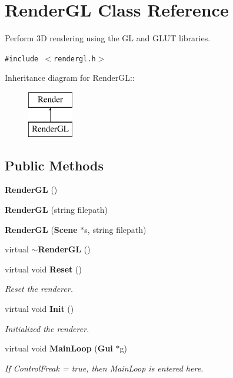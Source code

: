 \section{Render\-GL  Class Reference}
\label{classRenderGL}
Perform 3D rendering using the GL and GLUT libraries. 


{\tt \#include $<$rendergl.h$>$}

Inheritance diagram for Render\-GL::\begin{figure}[H]
\begin{center}
\leavevmode
\includegraphics[height=2cm]{classRenderGL}
\end{center}
\end{figure}
\subsection*{Public Methods}
\begin{CompactItemize}
\item 
{\bf Render\-GL} ()
\item 
{\bf Render\-GL} (string filepath)
\item 
{\bf Render\-GL} ({\bf Scene} $\ast$s, string filepath)
\item 
virtual {\bf $\sim$Render\-GL} ()
\item 
virtual void {\bf Reset} ()
\begin{CompactList}\small\item\em Reset the renderer.\item\end{CompactList}\item 
virtual void {\bf Init} ()
\begin{CompactList}\small\item\em Initialized the renderer.\item\end{CompactList}\item 
virtual void {\bf Main\-Loop} ({\bf Gui} $\ast$g)
\begin{CompactList}\small\item\em If Control\-Freak = true, then Main\-Loop is entered here.\item\end{CompactList}\end{CompactItemize}
